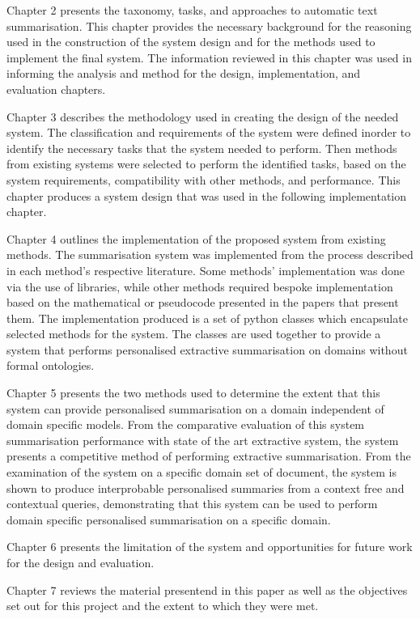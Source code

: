 Chapter 2 presents the taxonomy, tasks, and approaches to automatic text summarisation. This chapter provides the necessary background for the reasoning used in the construction of the system design and for the methods used to implement the final system. The information reviewed in this chapter was used in informing the analysis and method for the design, implementation, and evaluation chapters.

Chapter 3 describes the methodology used in creating the design of the needed system. The classification and requirements of the system were defined inorder to identify the necessary tasks that the system needed to perform. Then methods from existing systems were selected to perform the identified tasks, based on the system requirements, compatibility with other methods, and performance. This chapter produces a system design that was used in the following implementation chapter.

Chapter 4 outlines the implementation of the proposed system from existing methods. The summarisation system was implemented from the process described in each method's respective literature. Some methods’ implementation was done via the use of libraries, while other methods required bespoke implementation based on the mathematical or pseudocode presented in the papers that present them. The implementation produced is a set of python classes which encapsulate selected methods for the system. The classes are used together to provide a system that performs personalised extractive summarisation  on domains without formal ontologies.

Chapter 5 presents the two methods used to determine the extent that this system can provide personalised summarisation on a domain independent of domain specific models. From the comparative evaluation of this system summarisation performance with state of the art extractive system, the system presents a competitive method of performing extractive summarisation. From the examination of the system on a specific domain set of document, the system is shown to produce interprobable personalised summaries from a context free and contextual queries, demonstrating that this system can be used to perform domain specific personalised summarisation on a specific domain.

Chapter 6 presents the limitation of the system and opportunities for future work for the design and evaluation.

Chapter 7 reviews the material presentend in this paper as well as the objectives set out for this project and the extent to which they were met. 

\RaggedRight